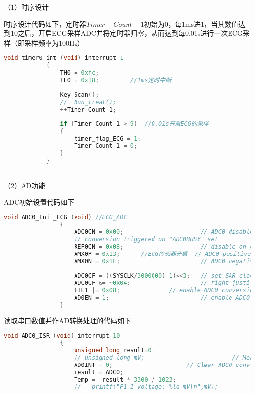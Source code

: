 \documentclass{zjureport}
\begin{document}
	（1）时序设计  
	    
	    时序设计代码如下，定时器$Timer-Count-1$初始为0，每1ms进1，当其数值达到10之后，开启ECG采样ADC并将定时器归零，从而达到每0.01s进行一次ECG采样（即采样频率为100Hz）
	    
	    \begin{lstlisting}[language=C]
	    	void timer0_int (void) interrupt 1
	    	{
	    		TH0 = 0xfc;
	    		TL0 = 0x18;			//1ms定时中断
	    		
	    		Key_Scan();
	    		//	Run_treat();
	    		++Timer_Count_1;
	    		
	    		if (Timer_Count_1 > 9)  //0.01s开启ECG的采样
	    		{
	    			timer_flag_ECG = 1;
	    			Timer_Count_1 = 0;
	    		}
	    	}
	    \end{lstlisting}
	  
	   ~\\
	    
	（2）AD功能                   
	        
	        ADC初始设置代码如下 
	         \begin{lstlisting}[language=C]
	         	void ADC0_Init_ECG (void) //ECG_ADC
	         	{
	         		ADC0CN = 0x00;                      // ADC0 disabled, normal tracking, 
	         		// conversion triggered on "ADC0BUSY" set
	         		REF0CN = 0x08;                      // disable on-chip VREF and buffer
	         		AMX0P = 0x13;      //ECG传感器开启  // ADC0 positive input = P1.1 
	         		AMX0N = 0x1F;                       // ADC0 negative input = GND
	         		
	         		ADC0CF = ((SYSCLK/3000000)-1)<<3;   // set SAR clock to 3MHz
	         		ADC0CF &= ~0x04;                    // right-justify results 
	         		EIE1 |= 0x08;              // enable ADC0 conversion complete int.
	         		AD0EN = 1;                          // enable ADC0
	         	}
	         \end{lstlisting}
	         
	         读取串口数值并作AD转换处理的代码如下
	          \begin{lstlisting}[language=C]
	         	void ADC0_ISR (void) interrupt 10
	         	{
	         		unsigned long result=0;
	         		// unsigned long mV;                         // Measured voltage in mV
	         		AD0INT = 0;                     // Clear ADC0 conv. complete flag
	         		result = ADC0;
	         		Temp =  result * 3300 / 1023;   
	         		//   printf("P1.1 voltage: %ld mV\n",mV);
	         \end{lstlisting}
	    
\end{document}
